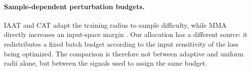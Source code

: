 \paragraph{Sample-dependent perturbation budgets.}
IAAT and CAT adapt the training radius to sample difficulty, while MMA directly increases an
input-space margin \citep{iaat,cat,mma}. Our allocation has a different source: it redistributes a
fixed batch budget according to the input sensitivity of the loss being optimized. The comparison is
therefore not between adaptive and uniform radii alone, but between the signals used to assign the
same budget.
